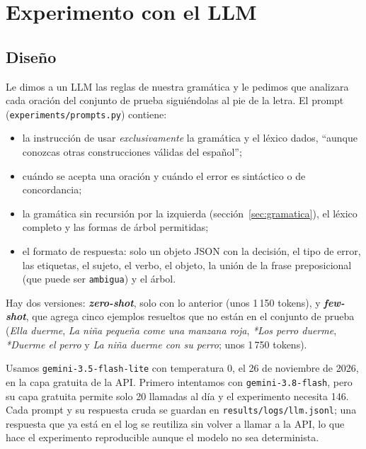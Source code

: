 \section{Experimento con el LLM}
\label{sec:analisis_llm}

\subsection{Diseño}

Le dimos a un LLM las reglas de nuestra gramática y le pedimos que analizara cada oración del
conjunto de prueba siguiéndolas al pie de la letra. El prompt
(\texttt{experiments/prompts.py}) contiene:
\begin{itemize}
  \item la instrucción de usar \emph{exclusivamente} la gramática y el léxico dados, ``aunque
    conozcas otras construcciones válidas del español'';
  \item cuándo se acepta una oración y cuándo el error es sintáctico o de concordancia;
  \item la gramática sin recursión por la izquierda (sección~\ref{sec:gramatica}), el léxico
    completo y las formas de árbol permitidas;
  \item el formato de respuesta: solo un objeto JSON con la decisión, el tipo de error, las
    etiquetas, el sujeto, el verbo, el objeto, la unión de la frase preposicional (que puede ser
    \texttt{ambigua}) y el árbol.
\end{itemize}
Hay dos versiones: \textbf{\emph{zero-shot}}, solo con lo anterior (unos 1\,150 tokens), y
\textbf{\emph{few-shot}}, que agrega cinco ejemplos resueltos que no están en el conjunto de
prueba (\emph{Ella duerme}, \emph{La niña pequeña come una manzana roja}, \emph{*Los perro
duerme}, \emph{*Duerme el perro} y \emph{La niña duerme con su perro}; unos 1\,750 tokens).

Usamos \texttt{gemini-3.5-flash-lite} con temperatura 0, el 26 de noviembre de 2026, en la capa
gratuita de la API. Primero intentamos con \texttt{gemini-3.8-flash}, pero su capa gratuita
permite solo 20 llamadas al día y el experimento necesita 146. Cada prompt y su respuesta cruda
se guardan en \texttt{results/logs/llm.jsonl}; una respuesta que ya está en el log se reutiliza
sin volver a llamar a la API, lo que hace el experimento reproducible aunque el modelo no sea
determinista.

